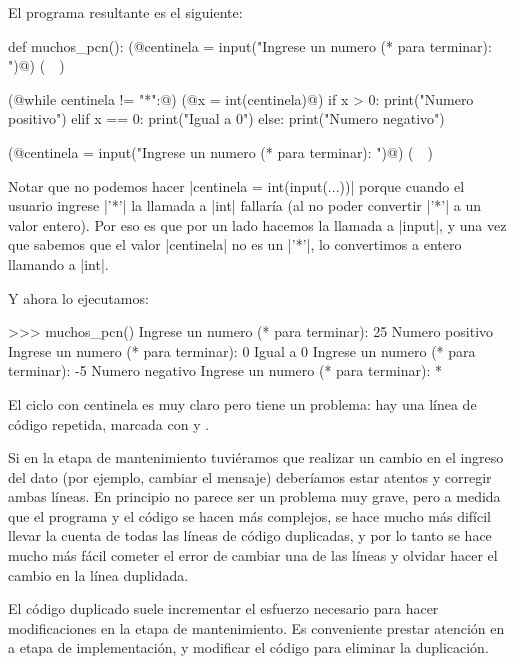 El programa resultante es el siguiente:

\begin{codigo-python-sn}
def muchos_pcn():
    (@centinela = input("Ingrese un numero (* para terminar): ")@) (~~)

    (@while centinela != "*":@)
        (@x = int(centinela)@)
        if x > 0:
            print("Numero positivo")
        elif x == 0:
            print("Igual a 0")
        else:
            print("Numero negativo")

        (@centinela = input("Ingrese un numero (* para terminar): ")@) (~~)
\end{codigo-python-sn}

Notar que no podemos hacer |centinela = int(input(...))| porque cuando el
usuario ingrese |'*'| la llamada a |int| fallaría (al no poder convertir |'*'|
a un valor entero). Por eso es que por un lado hacemos la llamada a |input|, y
una vez que sabemos que el valor |centinela| no es un |'*'|, lo convertimos a
entero llamando a |int|.

Y ahora lo ejecutamos:

\begin{codigo-python-sn}
>>> muchos_pcn()
Ingrese un numero (* para terminar): 25
Numero positivo
Ingrese un numero (* para terminar): 0
Igual a 0
Ingrese un numero (* para terminar): -5
Numero negativo
Ingrese un numero (* para terminar): *
\end{codigo-python-sn}

El ciclo con centinela es muy claro pero tiene un problema: hay una línea de
código repetida, marcada con  y .

Si en la etapa de mantenimiento tuviéramos que realizar un
cambio en el ingreso del dato (por ejemplo, cambiar el mensaje) deberíamos
estar atentos y corregir ambas líneas. En principio no parece ser un problema
muy grave, pero a medida que el programa y el código se hacen más complejos,
se hace mucho más difícil llevar la cuenta de todas las líneas de código
duplicadas, y por lo tanto se hace mucho más fácil cometer el error de cambiar
una de las líneas y olvidar hacer el cambio en la línea duplidada.

\begin{observacion}
El código duplicado suele incrementar el esfuerzo necesario para hacer
modificaciones en la etapa de mantenimiento. Es conveniente prestar atención en
a etapa de implementación, y modificar el código para eliminar la duplicación.
\end{observacion}

